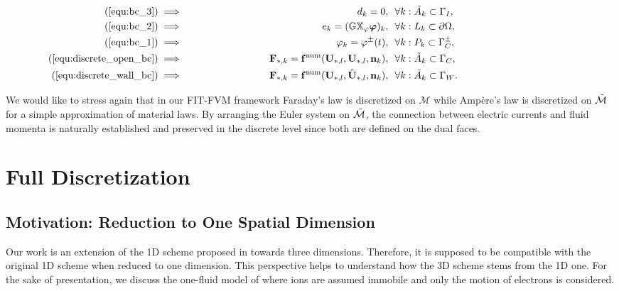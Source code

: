 \documentclass{article}
\begin{document}
\begin{subequations}
    \begin{align}
    (\ref{equ:bc_3}) & \implies \;\;\;\;\;\;\;\;\;\;\;\;\;\;\;\;\;\;\;\;\;\;\;\;\;\;\;\;& d_k = 0,\ \ &\forall k : \Tilde{A}_k \subset \Gamma_I,\;\;\;\;\;\;\;\;\;\;\;\;\;\;\;\;\;\;\;\;\;\;\;\;\;\;\;\;\;\;\;\;\;\;\;\;\;\;\;\;\;\;\;\;\\
    (\ref{equ:bc_2}) & \implies & e_k = (\mathbb{GX}_\varphi\bm{\varphi})_k,\ \ &\forall k : L_k \subset \partial\Omega, \\
    (\ref{equ:bc_1}) & \implies & \varphi_k = \varphi^\pm(t), \ \ &\forall k : P_k \subset \Gamma_C^\pm, \\ 
    (\ref{equ:discrete_open_bc}) & \implies & \mathbf{F}_{\ast,k} = \mathbf{f}^\text{num}(\mathbf{U}_{\ast,l}, \mathbf{U}_{\ast,l}, \mathbf{n}_k), \ \ &\forall k: \Tilde{A}_k \subset \Gamma_C, \\
    (\ref{equ:discrete_wall_bc}) & \implies & \mathbf{F}_{\ast,k} = \mathbf{f}^\text{num}(\mathbf{U}_{\ast,l}, \hat{\mathbf{U}}_{\ast,l}, \mathbf{n}_k), \ \ &\forall k: \Tilde{A}_k \subset \Gamma_W.
    \end{align}
\end{subequations}


We would like to stress again that in our FIT-FVM framework Faraday's law is discretized on $\mathcal{M}$ while Amp\`{e}re's law is discretized on $\Tilde{\mathcal{M}}$ for a simple approximation of material laws. By arranging the Euler system on $\Tilde{\mathcal{M}}$, the connection between electric currents and fluid momenta is naturally established and preserved in the discrete level since both are defined on the dual faces.    


\section{Full Discretization} \label{sec:full-discretization}
\subsection{Motivation: Reduction to One Spatial Dimension}
Our work is an extension of the 1D scheme proposed in \cite{degond_2012} towards three dimensions. Therefore, it is supposed to be compatible with the original 1D scheme when reduced to one dimension. This perspective helps to understand how the 3D scheme stems from the 1D one. For the sake of presentation, we discuss the one-fluid model of \cite{degond_2012} where ions are assumed immobile and only the motion of electrons is considered.  
\end{document}
